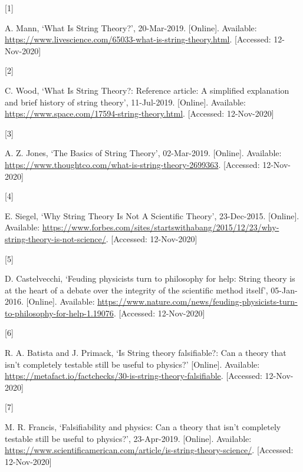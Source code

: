 \documentclass[
  a4paper,
]{article}
\newlength{\cslhangindent}
\newlength{\csllabelwidth}
\newlength{\cslentryspacingunit} %
\newenvironment{CSLReferences}[2] %
 {%
  \setlength{\parindent}{0pt}
  \ifodd #1
  \let\oldpar\par
  \def\par{\hangindent=\cslhangindent\oldpar}
  \fi
  \setlength{\parskip}{#2\cslentryspacingunit}
 }%
 {}
\newcommand{\CSLLeftMargin}[1]{\parbox[t]{\csllabelwidth}{#1}}
\newcommand{\CSLRightInline}[1]{\parbox[t]{\linewidth - \csllabelwidth}{#1}\break}
\begin{document}
\hypertarget{refs}{}
\begin{CSLReferences}{0}{0}
\leavevmode{}%
\CSLLeftMargin{{[}1{]} }
\CSLRightInline{A. Mann, {`{What Is String Theory?}'}, 20-Mar-2019.
{[}Online{]}. Available:
\url{https://www.livescience.com/65033-what-is-string-theory.html}.
{[}Accessed: 12-Nov-2020{]}}

\leavevmode{}%
\CSLLeftMargin{{[}2{]} }
\CSLRightInline{C. Wood, {`{What Is String Theory?}: Reference article:
A simplified explanation and brief history of string theory'},
11-Jul-2019. {[}Online{]}. Available:
\url{https://www.space.com/17594-string-theory.html}. {[}Accessed:
12-Nov-2020{]}}

\leavevmode{}%
\CSLLeftMargin{{[}3{]} }
\CSLRightInline{A. Z. Jones, {`{The Basics of String Theory}'},
02-Mar-2019. {[}Online{]}. Available:
\url{https://www.thoughtco.com/what-is-string-theory-2699363}.
{[}Accessed: 12-Nov-2020{]}}

\leavevmode{}%
\CSLLeftMargin{{[}4{]} }
\CSLRightInline{E. Siegel, {`{Why String Theory Is Not A Scientific
Theory}'}, 23-Dec-2015. {[}Online{]}. Available:
\url{https://www.forbes.com/sites/startswithabang/2015/12/23/why-string-theory-is-not-science/}.
{[}Accessed: 12-Nov-2020{]}}

\leavevmode{}%
\CSLLeftMargin{{[}5{]} }
\CSLRightInline{D. Castelvecchi, {`{Feuding physicists turn to
philosophy for help}: String theory is at the heart of a debate over the
integrity of the scientific method itself'}, 05-Jan-2016. {[}Online{]}.
Available:
\url{https://www.nature.com/news/feuding-physicists-turn-to-philosophy-for-help-1.19076}.
{[}Accessed: 12-Nov-2020{]}}

\leavevmode{}%
\CSLLeftMargin{{[}6{]} }
\CSLRightInline{R. A. Batista and J. Primack, {`{Is String theory
falsifiable?}: Can a theory that isn't completely testable still be
useful to physics?'} {[}Online{]}. Available:
\url{https://metafact.io/factchecks/30-is-string-theory-falsifiable}.
{[}Accessed: 12-Nov-2020{]}}

\leavevmode{}%
\CSLLeftMargin{{[}7{]} }
\CSLRightInline{M. R. Francis, {`{Falsifiability and physics}: Can a
theory that isn't completely testable still be useful to physics?'},
23-Apr-2019. {[}Online{]}. Available:
\url{https://www.scientificamerican.com/article/is-string-theory-science/}.
{[}Accessed: 12-Nov-2020{]}}


\end{CSLReferences}
\end{document}
